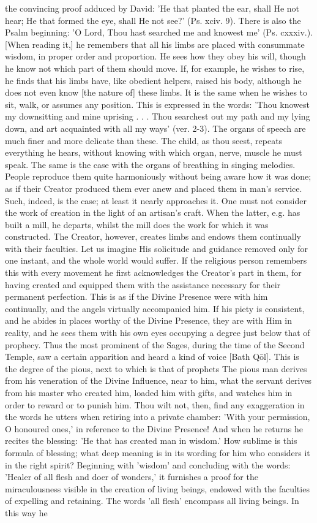 \documentclass[12pt]{article}
\begin{document}
the convincing proof adduced by David: 'He that planted the ear, shall He not hear; He that formed the eye, shall He not see?' (Ps. xciv. 9). There is also the Psalm beginning: 'O Lord, Thou hast searched me and knowest me' (Ps. cxxxiv.). [When reading it,] he remembers that all his limbs are placed with consummate wisdom, in proper order and proportion. He sees how they obey his will, though he know not which part of them should move. If, for example, he wishes to rise, he finds that his limbs have, like obedient helpers, raised his body, although he does not even know [the nature of] these limbs. It is the same when he wishes to sit, walk, or assumes any position. This is expressed in the words: 'Thou knowest my downsitting and mine uprising . . . Thou searchest out my path and my lying down, and art acquainted with all my ways' (ver. 2-3). The organs of speech are much finer and more delicate than these. The child, as thou seest, repeats everything he hears, without knowing with which organ, nerve, muscle he must speak. The same is the case with the organs of breathing in singing melodies. People reproduce them quite harmoniously without being aware how it was done; as if their Creator produced them ever anew and placed them in man's service. Such, indeed, is the case; at least it nearly approaches it. One must not consider the work of creation in the light of an artisan's craft. When the latter, e.g. has built a mill, he departs, whilst the mill does the work for which it was constructed. The Creator, however, creates limbs and endows them continually with their faculties. Let us imagine His solicitude and guidance removed only for one instant, and the whole world would suffer. If the religious person remembers this with every movement he first acknowledges the Creator's part in them, for having created and equipped them with the assistance necessary for their permanent perfection. This is as if the Divine Presence were with him continually, and the angels virtually accompanied him. If his piety is consistent, and he abides in places worthy of the Divine Presence, they are with Him in reality, and he sees them with his own eyes occupying a degree just below that of prophecy. Thus the most prominent of the Sages, during the time of the Second Temple, saw a certain apparition and heard a kind of voice [Bath Qōl]. This is the degree of the pious, next to which is that of prophets The pious man derives from his veneration of the Divine Influence, near to him, what the servant derives from his master who created him, loaded him with gifts, and watches him in order to reward or to punish him. Thou wilt not, then, find any exaggeration in the words he utters when retiring into a private chamber: 'With your permission, O honoured ones,' in reference to the Divine Presence! And when he returns he recites the blessing: 'He that has created man in wisdom.' How sublime is this formula of blessing; what deep meaning is in its wording for him who considers it in the right spirit? Beginning with 'wisdom' and concluding with the words: 'Healer of all flesh and doer of wonders,' it furnishes a proof for the miraculousness visible in the creation of living beings, endowed with the faculties of expelling and retaining. The words 'all flesh' encompass all living beings. In this way he 
\end{document}
